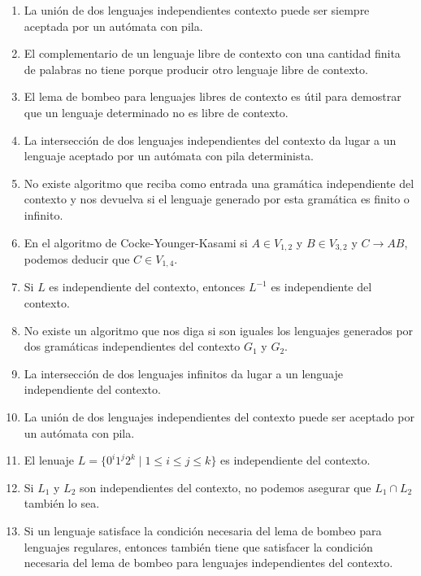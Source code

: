 \begin{enumerate}
    \item La unión de dos lenguajes independientes contexto puede ser siempre aceptada por un autómata con pila.
    \item El complementario de un lenguaje libre de contexto con una cantidad finita de palabras no tiene porque producir otro lenguaje libre de contexto.
    \item El lema de bombeo para lenguajes libres de contexto es útil para demostrar que un lenguaje determinado no es libre de contexto.
    \item La intersección de dos lenguajes independientes del contexto da lugar a un lenguaje aceptado por un autómata con pila determinista.
    \item No existe algoritmo que reciba como entrada una gramática independiente del contexto y nos devuelva si el lenguaje generado por esta gramática es finito o infinito.
    \item En el algoritmo de Cocke-Younger-Kasami si $A\in V_{1,2}$ y $B\in V_{3,2}$ y $C\rightarrow AB$, podemos deducir que $C\in V_{1,4}$.
    \item Si $L$ es independiente del contexto, entonces $L^{-1}$ es independiente del contexto.
    \item No existe un algoritmo que nos diga si son iguales los lenguajes generados por dos gramáticas independientes del contexto $G_1$ y $G_2$.
    \item La intersección de dos lenguajes infinitos da lugar a un lenguaje independiente del contexto.
    \item La unión de dos lenguajes independientes del contexto puede ser aceptado por un autómata con pila.
    \item El lenuaje $L=\{0^i 1^j 2^k \mid 1 \leq i \leq j \leq k\}$ es independiente del contexto.
    \item Si $L_1$ y $L_2$ son independientes del contexto, no podemos asegurar que $L_1 \cap L_2$ también lo sea.
    \item Si un lenguaje satisface la condición necesaria del lema de bombeo para lenguajes regulares, entonces también tiene que satisfacer la condición necesaria del lema de bombeo para lenguajes independientes del contexto.  
\end{enumerate}
